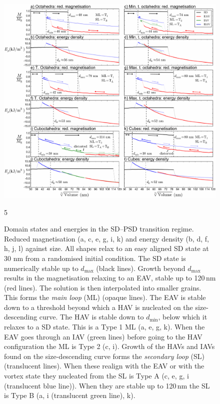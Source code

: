 \documentclass[review,authoryear]{elsarticle}
\newcommand{\dmax}{d_\text{max}}
\newcommand{\dmin}{d_\text{min}}
\newcommand{\nm}{\,\text{nm}}
\begin{document}
\begin{figure}[ht]
\centering
\includegraphics[width=\textwidth]{Figure_03.pdf}
\caption{Domain states and energies in the SD--PSD transition regime. Reduced magnetisation (a, c, e, g, i, k) and energy density (b, d, f, h, j, l) against size. All shapes relax to an easy aligned SD state at 30 nm from a randomised initial condition. The SD state is numerically stable up to $\dmax$ (black lines). Growth beyond $\dmax$ results in the magnetisation relaxing to an EAV, stable up to 120$\nm$ (red lines). The solution is then interpolated into smaller grains. This forms the \textit{main loop} (ML) (opaque lines). The EAV is stable down to a threshold beyond which a HAV is nucleated on the size-descending curve. The HAV is stable down to $\dmin$, below which it relaxes to a SD state. This is a Type 1 ML (a, e, g, k). When the EAV goes through an IAV (green lines) before going to the HAV configuration the ML is Type 2 (c, i). Growth of the HAVs and IAVs found on the size-descending curve forms the \textit{secondary loop} (SL) (translucent lines). When these realign with the EAV or with the vortex state they nucleated from the SL is Type A (c, e, g, i (translucent blue line)). When they are stable up to 120$\nm$ the SL is Type B (a, i (translucent green line), k).}
\label{fig3}5
\end{figure}
\end{document}
